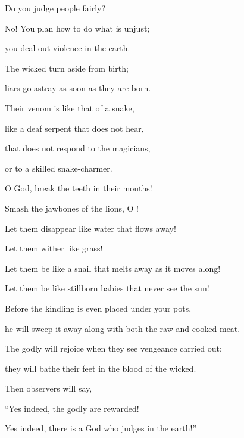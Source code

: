 {\par }{\Q Do you judge
people
fairly?
\par }{\Q {}No! You plan
how to do what
is unjust;
\par }{\Q you deal
out violence
in the earth.
\par }{\Q {}The wicked
turn aside
from birth;
\par }{\Q liars
go astray
as soon as they are born.
\par }{\Q {}Their venom
is like
that of a snake,
\par }{\Q like
a deaf
serpent
that does not
hear,
\par }{\Q {}that
does not
respond
to the magicians,
\par }{\Q or to a
skilled snake-charmer.
\par }{\Q {}O God,
break
the teeth
in their mouths!
\par }{\Q Smash
the jawbones
of the lions,
O
{}!
\par }{\Q {}Let
them disappear
like
water
that flows
away!

\par }{\Q Let them wither like
grass!
\par }{\Q {}Let them be like
a snail
that melts away
as it moves
along!

\par }{\Q Let them be like stillborn
babies
that never
see
the sun!
\par }{\Q {}Before
the kindling
is even placed under your pots,
\par }{\Q he will sweep it away
along with both the raw
and cooked meat.
\par }{\Q {}The godly
will rejoice
when
they see
vengeance
carried
out;
\par }{\Q they will bathe
their feet
in the blood
of the wicked.
\par }{\Q {}Then observers
will say,
\par }{\Q “Yes
indeed, the godly
are rewarded!

\par }{\Q Yes indeed,
there is
a God
who judges
in the earth!”


\par }
